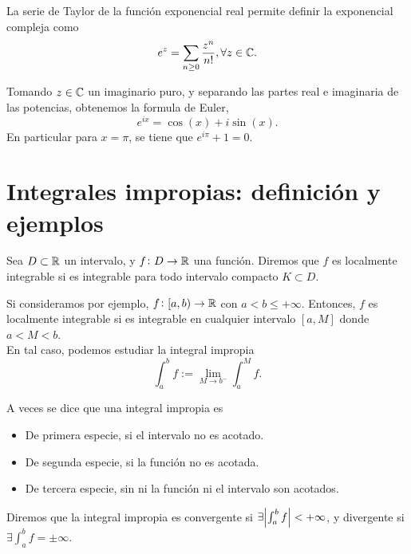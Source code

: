 \begin{obs*}
    La serie de Taylor de la función exponencial real permite definir la exponencial
    compleja como
    \[
        e^z = \sum_{n \geq 0} \frac{z^n}{n!}, \forall z \in \mathbb{C}.
    \]
\end{obs*}

\begin{prop*}
    Tomando $z \in \mathbb{C}$ un imaginario puro, y separando las partes real e imaginaria
    de las potencias, obtenemos la formula de Euler,
    \[
        e^{ix} = \cos(x) + i\sin(x).
    \]
    En particular para $x = \pi$, se tiene que $e^{i\pi} + 1 = 0$.
\end{prop*}



\section{Integrales impropias: definición y ejemplos}

\begin{defi}
    Sea $D \subset \mathbb{R}$ un intervalo, y $f \colon D \to \mathbb{R}$ una función.
    Diremos que $f$ es localmente integrable si es integrable para todo intervalo
    compacto $K \subset D$.
\end{defi}
\begin{obs}
    Si consideramos por ejemplo, $f \colon [a,b) \to \mathbb{R}$ con $a < b \leq +\infty$.
    Entonces, $f$ es localmente integrable si es integrable en cualquier intervalo
    $[a,M]$ donde $a < M < b$. \\
    En tal caso, podemos estudiar la integral impropia
    \[
        \int_a^b f := \lim_{M \to b^-} \int^M_a f.
    \]
\end{obs}

\begin{obs*}
    A veces se dice que una integral impropia es
    \begin{itemize}
        \item De primera especie, si el intervalo no es acotado.
        \item De segunda especie, si la función no es acotada.
        \item De tercera especie, sin ni la función ni el intervalo son acotados.
    \end{itemize}
\end{obs*}

\begin{defi}
    Diremos que la integral impropia es convergente si $\exists\abs{\int^b_a f}
    <+\infty$, y divergente si $\exists\int^b_a f = \pm\infty$.
\end{defi}

